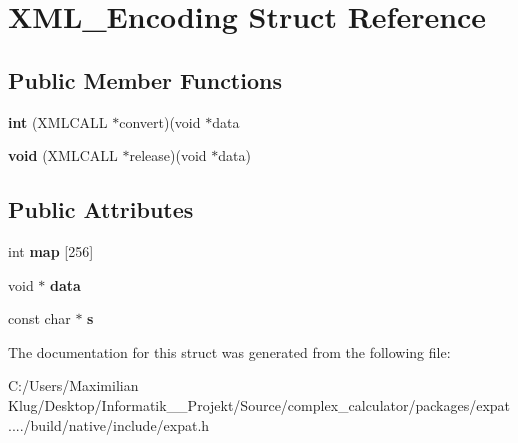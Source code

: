 \hypertarget{struct_x_m_l___encoding}{}\section{X\+M\+L\+\_\+\+Encoding Struct Reference}
\label{struct_x_m_l___encoding}
\subsection*{Public Member Functions}
\begin{DoxyCompactItemize}
\item 
\mbox{\label{struct_x_m_l___encoding_a0e78058177f2573fd3e3597cfea390ef}} 
{\bfseries int} (X\+M\+L\+C\+A\+LL $\ast$convert)(void $\ast$data
\item 
\mbox{\label{struct_x_m_l___encoding_a8af470efc752980eaed0893cd1a2353a}} 
{\bfseries void} (X\+M\+L\+C\+A\+LL $\ast$release)(void $\ast$data)
\end{DoxyCompactItemize}
\subsection*{Public Attributes}
\begin{DoxyCompactItemize}
\item 
\mbox{\label{struct_x_m_l___encoding_a969fc4ff9f38c5e5d9105efb1b64f8af}} 
int {\bfseries map} \mbox{[}256\mbox{]}
\item 
\mbox{\label{struct_x_m_l___encoding_a308f320aa234f14b1effd3526a7ae840}} 
void $\ast$ {\bfseries data}
\item 
\mbox{\label{struct_x_m_l___encoding_a71954164de94d278141718e5e80771ae}} 
const char $\ast$ {\bfseries s}
\end{DoxyCompactItemize}


The documentation for this struct was generated from the following file\+:\begin{DoxyCompactItemize}
\item 
C\+:/\+Users/\+Maximilian Klug/\+Desktop/\+Informatik\+\_\+\_\+\+Projekt/\+Source/complex\+\_\+calculator/packages/expat..../build/native/include/expat.\+h\end{DoxyCompactItemize}

